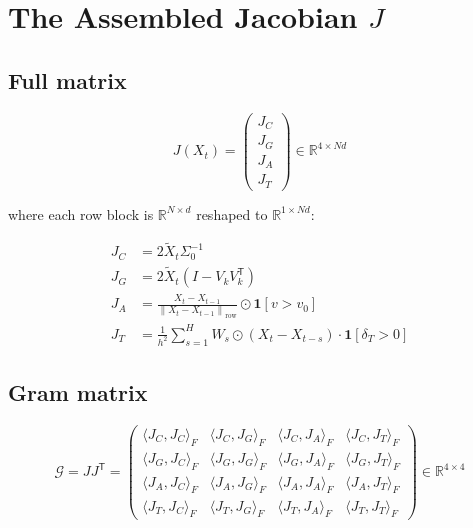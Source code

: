 \documentclass[11pt,a4paper]{article}
\theoremstyle{definition}
\newcommand{\R}{\mathbb{R}}
\newcommand{\T}{^{\mathsf{T}}}
\newcommand{\norm}[1]{\left\|#1\right\|}
\begin{document}
\section{The Assembled Jacobian $J$}

\subsection{Full matrix}

\begin{lockedbox}
\[
J(X_t) = \begin{pmatrix} J_C \\ J_G \\ J_A \\ J_T \end{pmatrix} \in \R^{4\times Nd}
\]
\end{lockedbox}

where each row block is $\R^{N\times d}$ reshaped to $\R^{1\times Nd}$:

\begin{align*}
J_C &= 2\tilde X_t\Sigma_0^{-1} \\[4pt]
J_G &= 2\tilde X_t(I - V_kV_k\T) \\[4pt]
J_A &= \frac{X_t-X_{t-1}}{\norm{X_t-X_{t-1}}_\mathrm{row}}\odot\mathbf{1}[v>v_0] \\[4pt]
J_T &= \frac{1}{h^2}\sum_{s=1}^H W_s\odot(X_t-X_{t-s})\cdot\mathbf{1}[\delta_T>0]
\end{align*}

\subsection{Gram matrix}

\begin{lockedbox}
\[
\mathcal{G} = JJ\T = \begin{pmatrix}
\langle J_C, J_C\rangle_F & \langle J_C, J_G\rangle_F & \langle J_C, J_A\rangle_F & \langle J_C, J_T\rangle_F \\
\langle J_G, J_C\rangle_F & \langle J_G, J_G\rangle_F & \langle J_G, J_A\rangle_F & \langle J_G, J_T\rangle_F \\
\langle J_A, J_C\rangle_F & \langle J_A, J_G\rangle_F & \langle J_A, J_A\rangle_F & \langle J_A, J_T\rangle_F \\
\langle J_T, J_C\rangle_F & \langle J_T, J_G\rangle_F & \langle J_T, J_A\rangle_F & \langle J_T, J_T\rangle_F
\end{pmatrix} \in \R^{4\times 4}
\]
\end{lockedbox}
\end{document}
